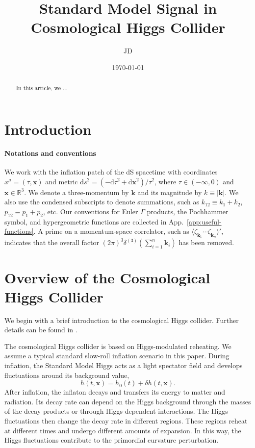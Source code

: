 \documentclass[a4paper,12pt]{article}
\title{\Large\textbf{Standard Model Signal in Cosmological Higgs Collider}\\[2mm]}
\author{JD}
\date{\today}
\def\di{{\mathrm{d}}}
\def\mb{\mathbf}
\begin{document}
\maketitle

\vspace{20mm}
\begin{abstract}

    In this article, we ...
    
\vspace{10mm}
\end{abstract}

\clearpage
\tableofcontents

\clearpage
\section{Introduction}
\label{sec:introduction}

\paragraph{Notations and conventions}
We work with the inflation patch of the dS spacetime with coordinates $x^\mu=(\tau,\bm x)$ and metric $\di s^2=(-\di\tau^2+\di\bm x^2)/\tau^2$, where $\tau\in(-\infty,0)$ and $\bm x\in\mathbb{R}^3$.
We denote a three-momentum by $\bm k$ and its magnitude by $k\equiv|\bm k|$.
We also use the condensed subscripts to denote summations, such as $k_{12}\equiv k_1+k_2$, $p_{12}\equiv p_1+p_2$, etc.
Our conventions for Euler $\Gamma$ products, the Pochhammer symbol, and hypergeometric functions are collected in App.~\ref{app:useful-functions}.
A prime on a momentum-space correlator, such as $\langle\zeta_{\bm k_1}\cdots\zeta_{\bm k_n}\rangle'$, indicates that the overall factor $(2\pi)^3\delta^{(3)}(\sum_{i=1}^n\bm k_i)$ has been removed.

\section{Overview of the Cosmological Higgs Collider}
\label{sec:chc-overview}
We begin with a brief introduction to the cosmological Higgs collider.
Further details can be found in \cite{lu_cosmological_2020}.

The cosmological Higgs collider is based on Higgs-modulated reheating.
We assume a typical standard slow-roll inflation scenario in this paper.
During inflation, the Standard Model Higgs acts as a light spectator field and develops fluctuations around its background value,
\begin{equation}
    h(t,\mb x)=h_0(t)+\delta h(t,\mb x).
    \label{eq:overview-higgs-split}
\end{equation}
After inflation, the inflaton decays and transfers its energy to matter and radiation.
Its decay rate can depend on the Higgs background through the masses of the decay products or through Higgs-dependent interactions.
The Higgs fluctuations then change the decay rate in different regions.
These regions reheat at different times and undergo different amounts of expansion.
In this way, the Higgs fluctuations contribute to the primordial curvature perturbation.
\end{document}

